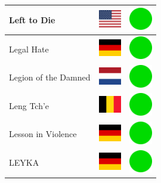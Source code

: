 \documentclass[12pt, a4paper, twoside]{report}
\begin{document}
\begin{center}
\begin{longtable}{|p{5cm}|p{2cm}|p{2cm}|}
 Left to Die                                                & \includegraphics[width=1cm]{../4x3/us} &   \includegraphics[width=1cm]{../likes/y} \\ \hline
 Legal Hate                                                 & \includegraphics[width=1cm]{../4x3/de} &   \includegraphics[width=1cm]{../likes/y} \\ \hline
 Legion of the Damned                                       & \includegraphics[width=1cm]{../4x3/nl} &   \includegraphics[width=1cm]{../likes/y} \\ \hline
 Leng Tch'e                                                 & \includegraphics[width=1cm]{../4x3/be} &   \includegraphics[width=1cm]{../likes/y} \\ \hline
 Lesson in Violence                                         & \includegraphics[width=1cm]{../4x3/de} &   \includegraphics[width=1cm]{../likes/y} \\ \hline
 LEYKA                                                      & \includegraphics[width=1cm]{../4x3/de} &   \includegraphics[width=1cm]{../likes/y} \\ \hline

\end{longtable}
\end{center}
\end{document}

